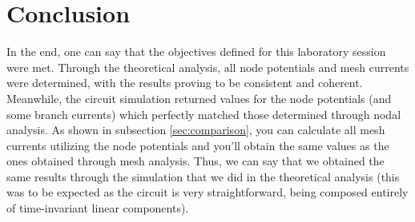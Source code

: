\section{Conclusion}
\label{sec:conclusion}

\par
In the end, one can say that the objectives defined for this laboratory session were met.
Through the theoretical analysis, all node potentials and mesh currents were determined, with the results proving to be consistent and coherent.
Meanwhile, the circuit simulation returned values for the node potentials (and some branch currents) which perfectly matched those determined through nodal analysis. As shown in subsection \ref{sec:comparison}, you can calculate all mesh currents utilizing the node potentials and you'll obtain the same values as the ones obtained through mesh analysis. Thus, we can say that we obtained the same results through the simulation that we did in the theoretical analysis (this was to be expected as the circuit is very straightforward, being composed entirely of time-invariant linear components).

